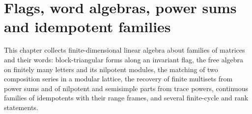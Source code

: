 \chapter{Flags, word algebras, power sums and idempotent families}
\label{ch:wordflags}

This chapter collects finite-dimensional linear algebra about families of
matrices and their words: block-triangular forms along an invariant flag, the
free algebra on finitely many letters and its nilpotent modules, the matching
of two composition series in a modular lattice, the recovery of finite
multisets from power sums and of nilpotent and semisimple parts from trace
powers, continuous families of idempotents with their range frames, and
several finite-cycle and rank statements.






